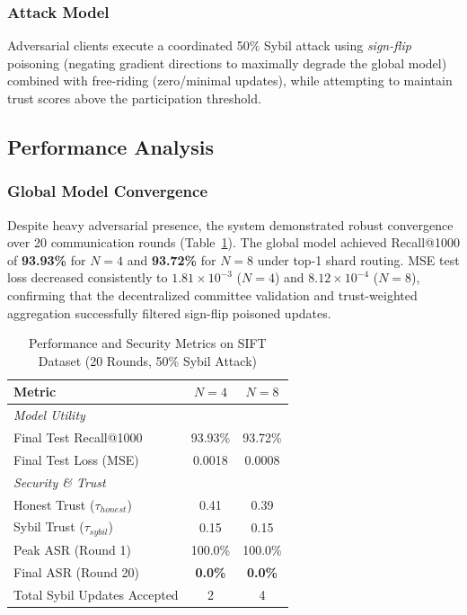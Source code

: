\documentclass[conference]{IEEEtran}
\begin{document}
\subsubsection{Attack Model}

Adversarial clients execute a coordinated 50\% Sybil attack using \emph{sign-flip} poisoning (negating gradient directions to maximally degrade the global model) combined with free-riding (zero/minimal updates), while attempting to maintain trust scores above the participation threshold.

\subsection{Performance Analysis}

\subsubsection{Global Model Convergence}

Despite heavy adversarial presence, the system demonstrated robust convergence over 20 communication rounds (Table~\ref{tab:results}). The global model achieved Recall@1000 of \textbf{93.93\%} for $N = 4$ and \textbf{93.72\%} for $N = 8$ under top-1 shard routing. MSE test loss decreased consistently to $1.81 \times 10^{-3}$ ($N = 4$) and $8.12 \times 10^{-4}$ ($N = 8$), confirming that the decentralized committee validation and trust-weighted aggregation successfully filtered sign-flip poisoned updates.

\begin{table}[t]
\centering
\caption{Performance and Security Metrics on SIFT Dataset (20 Rounds, 50\% Sybil Attack)}
\label{tab:results}
\begin{tabular}{lcc}
\toprule
\textbf{Metric} & \textbf{$N=4$} & \textbf{$N=8$} \\
\midrule
\multicolumn{3}{l}{\textit{Model Utility}} \\
Final Test Recall@1000 & 93.93\% & 93.72\% \\
Final Test Loss (MSE) & 0.0018 & 0.0008 \\
\midrule
\multicolumn{3}{l}{\textit{Security \& Trust}} \\
Honest Trust ($\tau_{honest}$) & 0.41 & 0.39 \\
Sybil Trust ($\tau_{sybil}$) & 0.15 & 0.15 \\
Peak ASR (Round 1) & 100.0\% & 100.0\% \\
Final ASR (Round 20) & \textbf{0.0\%} & \textbf{0.0\%} \\
Total Sybil Updates Accepted & 2 & 4 \\
\bottomrule
\end{tabular}
\end{table}
\end{document}
